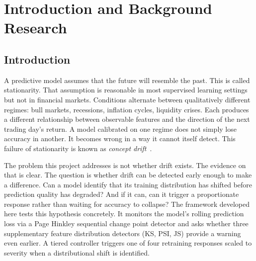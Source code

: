 
\chapter{Introduction and Background Research}
\label{ch:introduction}

\section{Introduction}
\label{sec:introduction}

A predictive model assumes that the future will resemble the past. This is called stationarity. That assumption is reasonable in most supervised learning settings but not in financial markets. Conditions alternate between qualitatively different regimes: bull markets, recessions, inflation cycles, liquidity crises. Each produces a different relationship between observable features and the direction of the next trading day's return. A model calibrated on one regime does not simply lose accuracy in another. It becomes wrong in a way it cannot itself detect. This failure of stationarity is known as \emph{concept drift}~\cite{widmer1996,gama2014survey}.

The problem this project addresses is not whether drift exists. The evidence on that is clear. The question is whether drift can be detected early enough to make a difference. Can a model identify that its training distribution has shifted before prediction quality has degraded? And if it can, can it trigger a proportionate response rather than waiting for accuracy to collapse? The framework developed here tests this hypothesis concretely. It monitors the model's rolling prediction loss via a Page Hinkley sequential change point detector and asks whether three supplementary feature distribution detectors (KS, PSI, JS) provide a warning even earlier. A tiered controller triggers one of four retraining responses scaled to severity when a distributional shift is identified.

